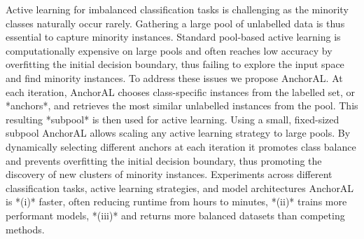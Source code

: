 Active learning for imbalanced classification tasks is challenging as the minority classes naturally occur rarely. Gathering a large pool of unlabelled data is thus essential to capture minority instances. Standard pool-based active learning is computationally expensive on large pools and often reaches low accuracy by overfitting the initial decision boundary, thus failing to explore the input space and find minority instances.     To address these issues we propose AnchorAL. At each iteration, AnchorAL chooses class-specific instances from the labelled set, or *anchors*, and retrieves the most similar unlabelled instances from the pool. This resulting *subpool* is then used for active learning.     Using a small, fixed-sized subpool AnchorAL allows scaling any active learning strategy to large pools. By dynamically selecting different anchors at each iteration it promotes class balance and prevents overfitting the initial decision boundary, thus promoting the discovery of new clusters of minority instances.     Experiments across different classification tasks, active learning strategies, and model architectures AnchorAL is *(i)* faster, often reducing runtime from hours to minutes, *(ii)* trains more performant models, *(iii)* and returns more balanced datasets than competing methods.